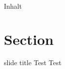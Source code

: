 \documentclass[xcolor=dvipsnames]{beamer}
\begin{document}
\begin{frame}[plain]
  \titlepage
\end{frame}

\begin{frame}{Inhalt}
\tableofcontents
\end{frame}

\section{Section}

\begin{frame}{slide title}
    Test
    Test
\end{frame}
\end{document}
